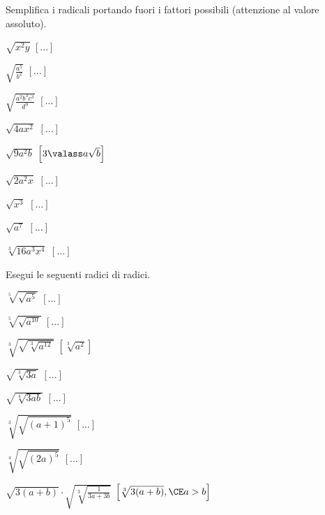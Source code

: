 \begin{esercizio}[\Ast]
 \label{ese:2.44}
Semplifica i radicali portando fuori i fattori possibili 
(attenzione al valore assoluto).
 \begin{multicols}{3}
 \begin{enumeratea}
 \item \(\sqrt{x^2y}\)
  \hfill \(\left[...\right]\)
 \item \(\sqrt{\frac{a^5}{b^2}}\)
  \hfill \(\left[...\right]\)
 \item \(\sqrt{\frac{a^2b^3c^3}{d^9}}\)
  \hfill \(\left[...\right]\)
 \item \(\sqrt{4ax^2}\)
  \hfill \(\left[...\right]\)
 \item \(\sqrt{9a^2b}\)
  \hfill \(\left[3\valass a\sqrt{b}\right]\)
 \item \(\sqrt{2a^2x}\)
  \hfill \(\left[...\right]\)
 \item \(\sqrt{x^3}\)
  \hfill \(\left[...\right]\)
 \item \(\sqrt{a^7}\)
  \hfill \(\left[...\right]\)
 \item \(\sqrt[3]{16a^3x^4}\)
  \hfill \(\left[...\right]\)
 \end{enumeratea}
 \end{multicols}
\end{esercizio}

\begin{esercizio}[\Ast]
 \label{ese:2.48}
Esegui le seguenti radici di radici.
 \begin{multicols}{3}
 \begin{enumeratea}
 \item \(\sqrt[5]{\sqrt{a^5}}\)
  \hfill \(\left[...\right]\)
 \item \(\sqrt[5]{\sqrt{a^{10}}}\)
  \hfill \(\left[...\right]\)
 \item \(\sqrt[3]{\sqrt{\sqrt[3]{a^{12}}}}\)
  \hfill \(\left[\sqrt[3]{a^2}\right]\)
 \item \(\sqrt{\sqrt[3]{3a}}\)
  \hfill \(\left[...\right]\)
 \item \(\sqrt{\sqrt[4]{3ab}}\)
  \hfill \(\left[...\right]\)
 \item \(\sqrt[3]{\sqrt{(a+1)^5}}\)
  \hfill \(\left[...\right]\)
 \item \(\sqrt[4]{\sqrt{(2a)^5}}\)
  \hfill \(\left[...\right]\)
 \item \(\sqrt{3(a+b)}\cdot \sqrt{\sqrt[3]{\frac 1{3a+3b}}}\)
  \hfill \(\left[\sqrt[3]{3(a+b)}, \CE a>b\right]\)
 \end{enumeratea}
 \end{multicols}
\end{esercizio}

